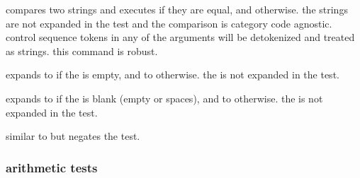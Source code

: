 \begin{ltxsyntax}


compares two strings and executes  if they are equal, and  otherwise. the strings are not expanded in the test and the comparison is category code agnostic. control sequence tokens in any of the  arguments will be detokenized and treated as strings. this command is robust.


expands to  if the  is empty, and to  otherwise. the  is not expanded in the test.


expands to  if the  is blank (empty or spaces), and to  otherwise. the  is not expanded in the test.


similar to  but negates the test.

\end{ltxsyntax}

\subsubsection{arithmetic tests}
\label{aut:tst:num}

